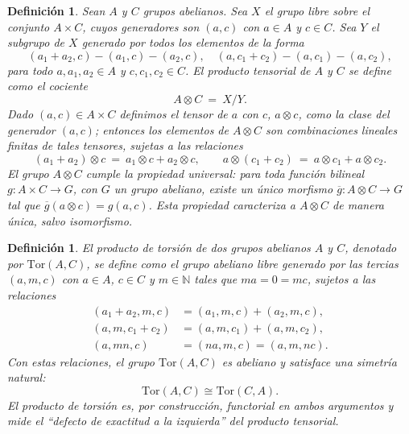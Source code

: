 \documentclass[12pt]{book}
\theoremstyle{plain}
\numberwithin{equation}{section} %
\newtheorem{definition}[thm]{Definición}
\begin{document}
\begin{definition}\label{def:tensor-product}
Sean $A$ y $C$ grupos abelianos. Sea $X$ el grupo libre sobre el conjunto
$A \times C$, cuyos generadores son $(a,c)$ con $a \in A$ y $c \in C$.
Sea $Y$ el subgrupo de $X$ generado por todos los elementos de la forma
\[
(a_1 + a_2, c) - (a_1, c) - (a_2, c), \quad
(a, c_1 + c_2) - (a, c_1) - (a, c_2),
\]
para todo $a,a_1,a_2 \in A$ y $c,c_1,c_2 \in C$. El \textit{producto tensorial}
de $A$ y $C$ se define como el cociente
\[
A \otimes C \ =\ X / Y.
\]
Dado $(a,c) \in A \times C$ definimos el tensor de $a$ con $c$, $a \otimes c$, como la clase del generador $(a,c)$; entonces los elementos de
$A \otimes C$ son combinaciones lineales finitas de tales tensores, sujetas a
las relaciones
\[
(a_1 + a_2) \otimes c \ =\ a_1 \otimes c + a_2 \otimes c, \qquad
a \otimes (c_1 + c_2) \ =\ a \otimes c_1 + a \otimes c_2.
\]
El grupo $A \otimes C$ cumple la \textit{propiedad universal}: para toda
función bilineal $g : A \times C \to G$, con $G$ un grupo abeliano, existe un único
morfismo $\overline{g} : A \otimes C \to G$ tal que
$\overline{g}(a \otimes c) = g(a,c)$. Esta propiedad caracteriza a
$A \otimes C$ de manera única, salvo isomorfismo.
\end{definition}

\begin{definition}\label{def:tor}
El \textit{producto de torsión} de dos grupos abelianos $A$ y $C$, denotado por
$\mathrm{Tor}(A,C)$, se define como el grupo abeliano libre generado por las tercias
$(a,m,c)$ con $a \in A$, $c \in C$ y $m \in \mathbb{N}$ tales que $ma = 0 = mc$,
sujetos a las relaciones
\[
\begin{aligned*}
(a_1 + a_2, m, c) &= (a_1, m, c) + (a_2, m, c),\\
(a, m, c_1 + c_2) &= (a, m, c_1) + (a, m, c_2),\\
(a, mn, c) &= (na, m, c) = (a, m, nc).
\end{aligned*}
\]
Con estas relaciones, el grupo $\mathrm{Tor}(A,C)$ es abeliano y satisface una
\textit{simetría natural}:
\[
\mathrm{Tor}(A,C) \cong \mathrm{Tor}(C,A).
\]
El producto de torsión es, por construcción, functorial en ambos argumentos y
mide el ``defecto de exactitud a la izquierda'' del producto tensorial.
\end{definition}

\end{document}
